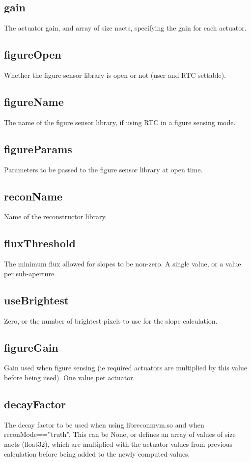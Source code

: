 \documentclass[a4,10pt]{article}
\begin{document}
\subsection{gain}
The actuator gain, and array of size nacts, specifying the gain for
each actuator.  


\subsection{figureOpen}
Whether the figure sensor library is open or not (user and RTC
settable).

\subsection{figureName}
The name of the figure sensor library, if using RTC in a figure
sensing mode.

\subsection{figureParams}
Parameters to be passed to the figure sensor library at open time.

\subsection{reconName}
Name of the reconstructor library.

\subsection{fluxThreshold}
The minimum flux allowed for slopes to be non-zero.  A single value,
or a value per sub-aperture.

\subsection{useBrightest}
Zero, or the number of brightest pixels to use for the slope
calculation.

\subsection{figureGain}
Gain used when figure sensing (ie required actuators are multiplied by
this value before being used).  One value per actuator.

\subsection{decayFactor}
The decay factor to be used when using libreconmvm.so and when
reconMode==''truth''.  This can be None, or defines an array of values
of size nacts (float32), which are multiplied with the actuator values from
previous calculation before being added to the newly computed values.
\end{document}
